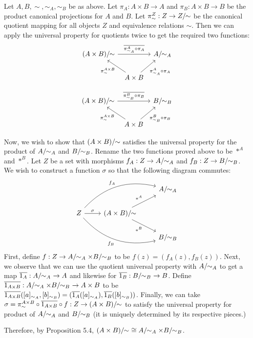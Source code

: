 \begin{solution}
	Let $A,B,\sim,\sim_A,\sim_B$ be as above. Let $\pi_A:A\times B\to A$ and
	$\pi_B:A\times B\to B$ be the product canonical projections for $A$ and $B$. Let
	$\pi^Z_\sim:Z\to Z/\!\!\sim$ be the canonical quotient mapping for all
	objects $Z$ and equivalence relations $\sim$. Then we can apply the universal
	property for quotients twice to get the required two functions:
	\[\begin{tikzcd}[column sep=tiny]
	\quotntws{(A\times B)}{\sim} \arrow[rr,"\quotuniv{\pi^A_{\sim_A}\circ\pi_A}"] && \quotntws{A}{\sim_A} \\
	&A\times B \arrow[ul,"\pi^{A\times B}_\sim"] \arrow[ur,swap, "\pi^A_{\sim_A}\circ\pi_A"]&
	\end{tikzcd}\]
	
	\[\begin{tikzcd}[column sep=tiny]
	\quotntws{(A\times B)}{\sim} \arrow[rr,"\quotuniv{\pi^B_{\sim_B}\circ\pi_B}"] && \quotntws{B}{\sim_B} \\
	&A\times B \arrow[ul,"\pi^{A\times B}_\sim"] \arrow[ur,swap, "\pi^B_{\sim_B}\circ\pi_B"]&
	\end{tikzcd}\]
	
	\def \quotA {\quotntws{A}{\sim_A}}
	\def \quotB {\quotntws{B}{\sim_B}}
	
	Now, we wish to show that $(A\times B)/\!\!\sim$ satisfies the universal
	property for the product of $\quotA$ and $\quotB$. Rename the two functions
	proved above to be $*^A$ and $*^B$. Let $Z$ be a set with morphisms
	$f_A:Z\to\quotA$ and $f_B:Z\to\quotB$. We wish to construct a function $\sigma$
	so that the following diagram commutes:
	\[\begin{tikzcd}
	&& \quotntws{A}{\sim_A} \\
	Z\arrow[r,"\sigma"]\arrow[urr,bend left,"f_A"]\arrow[drr,bend right,swap,"f_B"]
	&\quotntws{(A\times B)}{\sim}\arrow[ur,"*^A"]\arrow[dr,swap,"*^B"] \\
	&& \quotntws{B}{\sim_B}
	\end{tikzcd}\]
	\def \quotAB {\quotA\times\quotB}
	First, define $f:Z\to\quotAB$ to be $f(z)=(f_A(z),f_B(z))$. Next, we observe
	that we can use the quotient universal property with $\quotA$ to get a map
	$\quotuniv{1_A}:\quotA\,\,\to A$ and likewise for $\quotuniv{1_B}:\quotB\,\,\to
	B$. Define $\quotuniv{1_{A\times B}}:\quotAB\,\,\to A\times B$ to be
	$\overline{1_{A\times B}}([a]_{\sim_A},[b]_{\sim_B}) =
	(\overline{1_A}([a]_{\sim_A}), \overline{1_B}([b]_{\sim_B}))$. Finally, we can
	take $\sigma=\pi^{A\times B}_\sim \circ \overline{1_{A\times B}} \circ
	f:Z\to(A\times B)/\!\!\sim$ to satisfy the universal property for
	product of $\quotA$ and $\quotB$ (it is uniquely determined by its respective
	pieces.)
	
	Therefore, by Proposition 5.4, $\quot{(A\times B)}{\sim}\cong\quotA \times
	\quotB$.
\end{solution}


